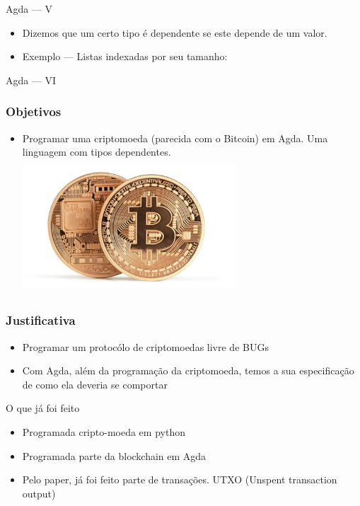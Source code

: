 \documentclass{beamer}
\begin{document}
       \begin{frame}{Agda --- V}
         \begin{itemize}
           \item Dizemos que um certo tipo é dependente se este depende de um valor.
           \item Exemplo --- Listas indexadas por seu tamanho:
         \end{itemize}
\end{frame}

       \begin{frame}{Agda --- VI}
	\begin{adjustwidth}{-3.5em}{-2em} \fontsize{8}{11}
	\end{adjustwidth}
\end{frame}
 
 \begin{frame}
\frametitle{Objetivos}
\begin{itemize}
    \item Programar uma criptomoeda (parecida com o Bitcoin) em Agda. Uma linguagem com tipos dependentes.
    \includegraphics[width=8cm, height=5cm]{TwoBitcoins}
\end{itemize}
\end{frame}

 \begin{frame}
\frametitle{Justificativa}
\begin{itemize}
    \item Programar um protocólo de criptomoedas livre de BUGs
    \item Com Agda, além da programação da criptomoeda, temos a sua especificação de como ela deveria se comportar
\end{itemize}
\end{frame}

  \begin{frame}{O que já foi feito}
    \begin{itemize}
        \item Programada cripto-moeda em python
        \item Programada parte da blockchain em Agda
        \item Pelo paper, já foi feito parte de transações. UTXO (Unspent transaction output)
    \end{itemize}
  \end{frame}
  
\end{document}
